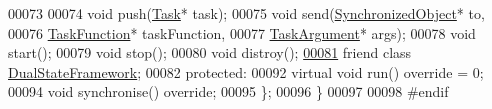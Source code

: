 \begin{DoxyCode}
00073         
00074         \textcolor{keywordtype}{void} push(\hyperlink{classdsf_1_1_task}{Task}* task);
00075         \textcolor{keywordtype}{void} send(\hyperlink{classdsf_1_1_synchronized_object}{SynchronizedObject}* to,
00076                   \hyperlink{namespacedsf_aa16e735f29587f4485b56fc46746f7a9}{TaskFunction}* taskFunction,
00077                   \hyperlink{namespacedsf_abe4bf68433935a81c31a5ada9b17663a}{TaskArgument}* args);
00078         \textcolor{keywordtype}{void} start();
00079         \textcolor{keywordtype}{void} stop();
00080         \textcolor{keywordtype}{void} distroy();
\hypertarget{_synchronized_object_8h_source_l00081}{}\hyperlink{classdsf_1_1_synchronized_object_a86db03c65431cb461cc8abf33bd2e74a}{00081}         \textcolor{keyword}{friend} \textcolor{keyword}{class }\hyperlink{classdsf_1_1_dual_state_framework}{DualStateFramework};
00082     \textcolor{keyword}{protected}:
00092         \textcolor{keyword}{virtual} \textcolor{keywordtype}{void} run() \textcolor{keyword}{override} = 0;
00094         \textcolor{keywordtype}{void} synchronise() \textcolor{keyword}{override};
00095     \};
00096 \}
00097 
00098 \textcolor{preprocessor}{#endif}
\end{DoxyCode}
